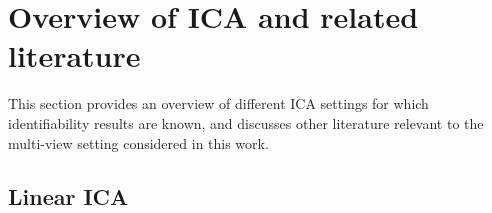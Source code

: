 
\section{Overview of ICA and related literature}\label{sec:ica-literature-overview}

This section provides an overview of different ICA settings for which identifiability results are known, and discusses other literature relevant to the multi-view setting considered in this work.





\subsection{Linear ICA}\label{subsec:ica-literature-linear-ica}



